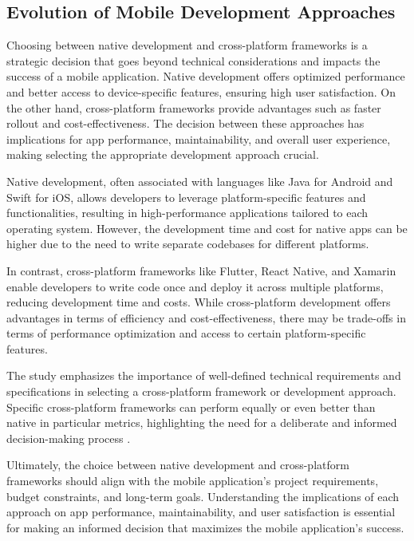 \subsection{Evolution of Mobile Development Approaches}
Choosing between native development and cross-platform frameworks is a strategic decision that goes beyond technical considerations and impacts the success of a mobile application. Native development offers optimized performance and better access to device-specific features, ensuring high user satisfaction. On the other hand, cross-platform frameworks provide advantages such as faster rollout and cost-effectiveness. The decision between these approaches has implications for app performance, maintainability, and overall user experience, making selecting the appropriate development approach crucial.
\par
Native development, often associated with languages like Java for Android and Swift for iOS, allows developers to leverage platform-specific features and functionalities, resulting in high-performance applications tailored to each operating system. However, the development time and cost for native apps can be higher due to the need to write separate codebases for different platforms.
\par
In contrast, cross-platform frameworks like Flutter, React Native, and Xamarin enable developers to write code once and deploy it across multiple platforms, reducing development time and costs. While cross-platform development offers advantages in terms of efficiency and cost-effectiveness, there may be trade-offs in terms of performance optimization and access to certain platform-specific features.
\par
The study emphasizes the importance of well-defined technical requirements and specifications in selecting a cross-platform framework or development approach. Specific cross-platform frameworks can perform equally or even better than native in particular metrics, highlighting the need for a deliberate and informed decision-making process \cite{biorn2020empirical}.
\par
Ultimately, the choice between native development and cross-platform frameworks should align with the mobile application’s project requirements, budget constraints, and long-term goals. Understanding the implications of each approach on app performance, maintainability, and user satisfaction is essential for making an informed decision that maximizes the mobile application's success.

